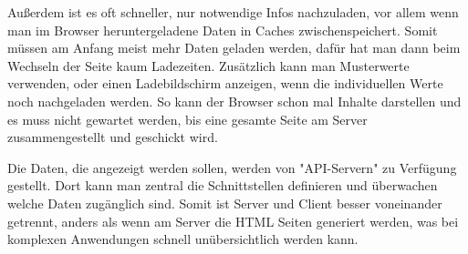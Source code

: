 Außerdem ist es oft schneller, nur notwendige Infos nachzuladen, vor allem wenn man im Browser heruntergeladene Daten in Caches zwischenspeichert. Somit müssen am Anfang meist mehr Daten geladen werden, dafür hat man dann beim Wechseln der Seite kaum Ladezeiten. Zusätzlich kann man Musterwerte verwenden, oder einen Ladebildschirm anzeigen, wenn die individuellen Werte noch nachgeladen werden. So kann der Browser schon mal Inhalte darstellen und es muss nicht gewartet werden, bis eine gesamte Seite am Server zusammengestellt und geschickt wird.

Die Daten, die angezeigt werden sollen, werden von "API-Servern" zu Verfügung gestellt. Dort kann man zentral die Schnittstellen definieren und überwachen welche Daten zugänglich sind. Somit ist Server und Client besser voneinander getrennt, anders als wenn am Server die HTML Seiten generiert werden, was bei komplexen Anwendungen schnell unübersichtlich werden kann.

